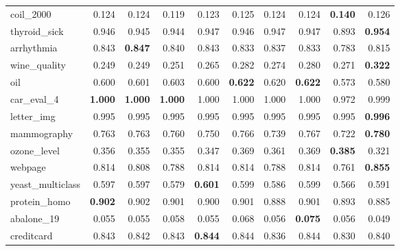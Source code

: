 {\begin{longtable}{lrrrrrrrrr}
coil\_2000 & 0.124 & 0.124 & 0.119 & 0.123 & 0.125 & 0.124 & 0.124 & \textbf{0.140} & 0.126 \\
thyroid\_sick & 0.946 & 0.945 & 0.944 & 0.947 & 0.946 & 0.947 & 0.947 & 0.893 & \textbf{0.954} \\
arrhythmia & 0.843 & \textbf{0.847} & 0.840 & 0.843 & 0.833 & 0.837 & 0.833 & 0.783 & 0.815 \\
wine\_quality & 0.249 & 0.249 & 0.251 & 0.265 & 0.282 & 0.274 & 0.280 & 0.271 & \textbf{0.322} \\
oil & 0.600 & 0.601 & 0.603 & 0.600 & \textbf{0.622} & 0.620 & \textbf{0.622} & 0.573 & 0.580 \\
car\_eval\_4 & \textbf{1.000} & \textbf{1.000} & \textbf{1.000} & 1.000 & 1.000 & 1.000 & 1.000 & 0.972 & 0.999 \\
letter\_img & 0.995 & 0.995 & 0.995 & 0.995 & 0.995 & 0.995 & 0.995 & 0.995 & \textbf{0.996} \\
mammography & 0.763 & 0.763 & 0.760 & 0.750 & 0.766 & 0.739 & 0.767 & 0.722 & \textbf{0.780} \\
ozone\_level & 0.356 & 0.355 & 0.355 & 0.347 & 0.369 & 0.361 & 0.369 & \textbf{0.385} & 0.321 \\
webpage & 0.814 & 0.808 & 0.788 & 0.814 & 0.814 & 0.788 & 0.814 & 0.761 & \textbf{0.855} \\
yeast\_multiclass & 0.597 & 0.597 & 0.579 & \textbf{0.601} & 0.599 & 0.586 & 0.599 & 0.566 & 0.591 \\
protein\_homo & \textbf{0.902} & 0.902 & 0.901 & 0.900 & 0.901 & 0.888 & 0.901 & 0.893 & 0.885 \\
abalone\_19 & 0.055 & 0.055 & 0.058 & 0.055 & 0.068 & 0.056 & \textbf{0.075} & 0.056 & 0.049 \\
creditcard & 0.843 & 0.842 & 0.843 & \textbf{0.844} & 0.844 & 0.836 & 0.844 & 0.830 & 0.840 \\
\bottomrule
\end{longtable}}
